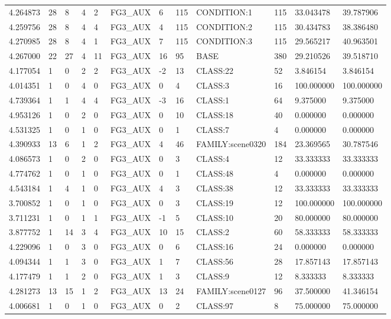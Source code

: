 \begin{tabular}{llllllllllll}
4.264873 & 28 & 8 & 4 & 2 & FG3\_AUX & 6 & 115 & CONDITION:1 & 115 & 33.043478 & 39.787906 \\
4.259756 & 28 & 8 & 4 & 4 & FG3\_AUX & 4 & 115 & CONDITION:2 & 115 & 30.434783 & 38.386480 \\
4.270985 & 28 & 8 & 4 & 1 & FG3\_AUX & 7 & 115 & CONDITION:3 & 115 & 29.565217 & 40.963501 \\
4.267000 & 22 & 27 & 4 & 11 & FG3\_AUX & 16 & 95 & BASE & 380 & 29.210526 & 39.518710 \\
4.177054 & 1 & 0 & 2 & 2 & FG3\_AUX & -2 & 13 & CLASS:22 & 52 & 3.846154 & 3.846154 \\
4.014351 & 1 & 0 & 4 & 0 & FG3\_AUX & 0 & 4 & CLASS:3 & 16 & 100.000000 & 100.000000 \\
4.739364 & 1 & 1 & 4 & 4 & FG3\_AUX & -3 & 16 & CLASS:1 & 64 & 9.375000 & 9.375000 \\
4.953126 & 1 & 0 & 2 & 0 & FG3\_AUX & 0 & 10 & CLASS:18 & 40 & 0.000000 & 0.000000 \\
4.531325 & 1 & 0 & 1 & 0 & FG3\_AUX & 0 & 1 & CLASS:7 & 4 & 0.000000 & 0.000000 \\
4.390933 & 13 & 6 & 1 & 2 & FG3\_AUX & 4 & 46 & FAMILY:scene0320 & 184 & 23.369565 & 30.787546 \\
4.086573 & 1 & 0 & 2 & 0 & FG3\_AUX & 0 & 3 & CLASS:4 & 12 & 33.333333 & 33.333333 \\
4.774762 & 1 & 0 & 1 & 0 & FG3\_AUX & 0 & 1 & CLASS:48 & 4 & 0.000000 & 0.000000 \\
4.543184 & 1 & 4 & 1 & 0 & FG3\_AUX & 4 & 3 & CLASS:38 & 12 & 33.333333 & 33.333333 \\
3.700852 & 1 & 0 & 1 & 0 & FG3\_AUX & 0 & 3 & CLASS:19 & 12 & 100.000000 & 100.000000 \\
3.711231 & 1 & 0 & 1 & 1 & FG3\_AUX & -1 & 5 & CLASS:10 & 20 & 80.000000 & 80.000000 \\
3.877752 & 1 & 14 & 3 & 4 & FG3\_AUX & 10 & 15 & CLASS:2 & 60 & 58.333333 & 58.333333 \\
4.229096 & 1 & 0 & 3 & 0 & FG3\_AUX & 0 & 6 & CLASS:16 & 24 & 0.000000 & 0.000000 \\
4.094344 & 1 & 1 & 3 & 0 & FG3\_AUX & 1 & 7 & CLASS:56 & 28 & 17.857143 & 17.857143 \\
4.177479 & 1 & 1 & 2 & 0 & FG3\_AUX & 1 & 3 & CLASS:9 & 12 & 8.333333 & 8.333333 \\
4.281273 & 13 & 15 & 1 & 2 & FG3\_AUX & 13 & 24 & FAMILY:scene0127 & 96 & 37.500000 & 41.346154 \\
4.006681 & 1 & 0 & 1 & 0 & FG3\_AUX & 0 & 2 & CLASS:97 & 8 & 75.000000 & 75.000000 \\

\end{tabular}
